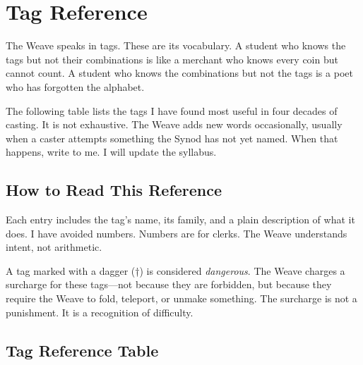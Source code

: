 \chapter{Tag Reference}

The Weave speaks in tags. These are its vocabulary. A student who knows the tags but not their combinations is like a merchant who knows every coin but cannot count. A student who knows the combinations but not the tags is a poet who has forgotten the alphabet.

The following table lists the tags I have found most useful in four decades of casting. It is not exhaustive. The Weave adds new words occasionally, usually when a caster attempts something the Synod has not yet named. When that happens, write to me. I will update the syllabus.

\section{How to Read This Reference}

Each entry includes the tag's name, its family, and a plain description of what it does. I have avoided numbers. Numbers are for clerks. The Weave understands intent, not arithmetic.

A tag marked with a dagger (†) is considered \emph{dangerous}. The Weave charges a surcharge for these tags---not because they are forbidden, but because they require the Weave to fold, teleport, or unmake something. The surcharge is not a punishment. It is a recognition of difficulty.

\section{Tag Reference Table}

